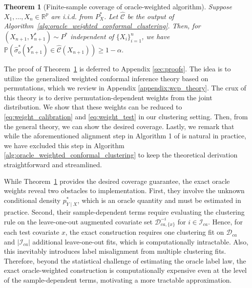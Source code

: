 \documentclass[11pt,letterpaper]{article}
\newtheorem{theorem}{Theorem} %
\theoremstyle{definition}
\newcommand{\cC}{\mathcal{C}}
\newcommand{\cD}{\mathcal{D}}
\newcommand{\cI}{\mathcal{I}}
\newcommand{\R}{\mathbb{R}}
\renewcommand{\P}{\mathbb{P}}
\begin{document}
\begin{theorem}[Finite-sample coverage of oracle-weighted algorithm]
    \label{thm:exact_weights}
    Suppose $X_1,\ldots,X_n \in \R^p$ are i.i.d. from $P^\ast_X$. Let \(\hat{\cC}\) be the output of Algorithm~\ref{alg:oracle_weighted_conformal_clustering}. Then, for $(X_{n+1},Y_{n+1}^\ast)\sim P^\ast$ independent of $\{X_i\}_{i=1}^n$, we have
    \(
    \P(\hat{\sigma}_o^\ast(Y_{n+1}^\ast)\in \hat{\cC}(X_{n+1}))\ge 1-\alpha.
    \)
\end{theorem}

The proof of Theorem~\ref{thm:exact_weights} is deferred to Appendix \ref{sec:proofs}. The idea is to utilize the generalized weighted conformal inference theory based on permutations, which we review in Appendix \ref{appendix:wcp_theory}. The crux of this theory is to derive permutation-dependent weights from the joint distribution. We show that these weights can be reduced to \eqref{eq:weight_calibration} and \eqref{eq:weight_test} in our clustering setting. Then, from the general theory, we can show the desired coverage. Lastly, we remark that while the aforementioned alignment step in Algorithm 1 of \cite{hur2026inference} is natural in practice, we have excluded this step in Algorithm \ref{alg:oracle_weighted_conformal_clustering} to keep the theoretical derivation straightforward and streamlined.

While Theorem~\ref{thm:exact_weights} provides the desired coverage guarantee, the exact oracle weights reveal two obstacles to implementation. First, they involve the unknown conditional density \(p_{Y\mid X}^\ast\), which is an oracle quantity and must be estimated in practice. Second, their sample-dependent terms require evaluating the clustering rule on the leave-one-out augmented covariate set \(\cD_{ca, \{x\}}^{-i}\) for \(i \in \cI_{ca}\). Hence, for each test covariate \(x\), the exact construction requires one clustering fit on \(\cD_{ca}\) and \(|\cI_{ca}|\) additional leave-one-out fits, which is computationally intractable. Also, this inevitably introduces label misalignment from multiple clustering fits. Therefore, beyond the statistical challenge of estimating the oracle label law, the exact oracle-weighted construction is computationally expensive even at the level of the sample-dependent terms, motivating a more tractable approximation.
\end{document}
